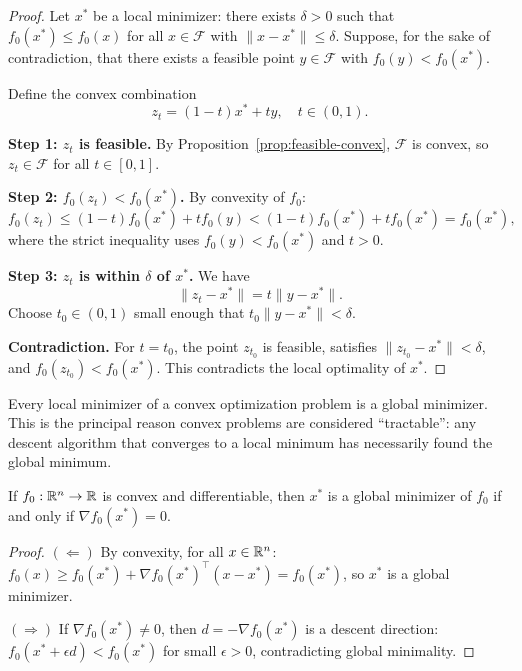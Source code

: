 \documentclass[11pt,a4paper]{article}
\begin{document}
\begin{proof}
Let $x^*$ be a local minimizer: there exists $\delta > 0$ such that
$f_0(x^*) \le f_0(x)$ for all $x \in \mathcal{F}$ with
$\|x - x^*\| \le \delta$. Suppose, for the sake of contradiction, that there
exists a feasible point $y \in \mathcal{F}$ with $f_0(y) < f_0(x^*)$.

Define the convex combination
\begin{equation}\label{eq:convex-combo}
  z_t = (1-t) x^* + t y, \quad t \in (0,1).
\end{equation}

\textbf{Step 1: $z_t$ is feasible.} By Proposition~\ref{prop:feasible-convex},
$\mathcal{F}$ is convex, so $z_t \in \mathcal{F}$ for all $t \in [0,1]$.

\textbf{Step 2: $f_0(z_t) < f_0(x^*)$.} By convexity of $f_0$:
\begin{equation}\label{eq:convex-bound}
  f_0(z_t) \le (1-t) f_0(x^*) + t f_0(y) < (1-t) f_0(x^*) + t f_0(x^*) = f_0(x^*),
\end{equation}
where the strict inequality uses $f_0(y) < f_0(x^*)$ and $t > 0$.

\textbf{Step 3: $z_t$ is within $\delta$ of $x^*$.} We have
\[
  \|z_t - x^*\| = t\|y - x^*\|.
\]
Choose $t_0 \in (0,1)$ small enough that $t_0 \|y - x^*\| < \delta$.

\textbf{Contradiction.} For $t = t_0$, the point $z_{t_0}$ is feasible,
satisfies $\|z_{t_0} - x^*\| < \delta$, and $f_0(z_{t_0}) < f_0(x^*)$.
This contradicts the local optimality of $x^*$.
\end{proof}

\begin{keyresult}[title={Local Implies Global for Convex Problems}]
Every local minimizer of a convex optimization problem is a global minimizer.
This is the principal reason convex problems are considered ``tractable'':
any descent algorithm that converges to a local minimum has necessarily found
the global minimum.
\end{keyresult}

\begin{corollary}%
\label{cor:first-order}
If $f_0 : \mathbb{R}^n \to \mathbb{R}$ is convex and differentiable, then $x^*$ is a global
minimizer of $f_0$ if and only if $\nabla f_0(x^*) = 0$.
\end{corollary}

\begin{proof}
$(\Leftarrow)$ By convexity, for all $x \in \mathbb{R}^n$:
$f_0(x) \ge f_0(x^*) + \nabla f_0(x^*)^\top(x - x^*) = f_0(x^*)$,
so $x^*$ is a global minimizer.

$(\Rightarrow)$ If $\nabla f_0(x^*) \neq 0$, then $d = -\nabla f_0(x^*)$
is a descent direction: $f_0(x^* + \epsilon d) < f_0(x^*)$ for small
$\epsilon > 0$, contradicting global minimality.
\end{proof}
\end{document}
